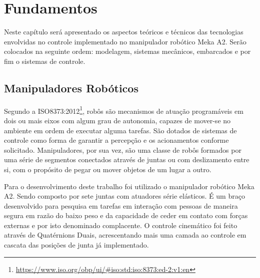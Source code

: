 \chapter{Fundamentos}\label{ch:teory-reference}





\vspace{0.5cm}
Neste capítulo será apresentado os aspectos teóricos e técnicos das tecnologias envolvidas no controle implementado no manipulador robótico Meka A2. Serão colocados na seguinte ordem: modelagem, sistemas mecânicos, embarcados e por fim o sistemas de controle.

\section{Manipuladores Robóticos}

Segundo a ISO8373:2012\footnote{\url{https://www.iso.org/obp/ui/#iso:std:iso:8373:ed-2:v1:en}}, robôs são mecanismos de atuação programáveis em dois ou mais eixos com algum grau de autonomia, capazes de mover-se no ambiente em ordem de executar alguma tarefas. São dotados de sistemas de controle como forma de garantir a percepção e os acionamentos conforme solicitado. Manipuladores, por sua vez, são uma classe de robôs formados por uma série de segmentos conectados através de juntas ou com deslizamento entre si, com o propósito de pegar ou mover objetos de um lugar a outro.

Para o desenvolvimento deste trabalho foi utilizado o manipulador robótico Meka A2. Sendo composto por sete juntas com atuadores série elásticos. É um braço desenvolvido para pesquisa em tarefas em interação com pessoas de maneira segura em razão do baixo peso e da capacidade de ceder em contato com forças externas e por isto denominado complacente. O controle cinemático foi feito através de Quatérnions Duais, acrescentando mais uma camada ao controle em cascata das posições de junta já implementado.

